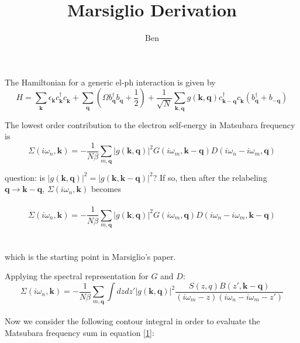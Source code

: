 \documentclass[]{article}
\title{Marsiglio Derivation}
\author{Ben}
\newcommand{\kk}{\mathbf{k}}
\newcommand{\qq}{\mathbf{q}}
\newcommand{\iwn}{i\omega_n}
\newcommand{\iwm}{i\omega_m}
\newcommand{\cd}[1]{c_{#1}^\dagger}
\newcommand{\cc}[1]{c_{#1}^{\phantom{\dagger}}}
\newcommand{\gs}{\left| g(\mathbf{k}, \mathbf{q}) \right|^2}
\begin{document}
\maketitle

\begin{abstract}

\end{abstract}

The Hamiltonian for a generic el-ph interaction is given by
\begin{equation}
H = \sum_\kk \epsilon_\kk \cd{\kk} \cc{\kk}
 + \sum_\qq \left( \Omega b^\dagger_\qq b^{\phantom{\dagger}}_\qq + \frac{1}{2}\right) + \frac{1}{\sqrt{N}} \sum_{\kk,\qq} g(\kk, \qq) \cd{\kk-\qq} \cc{\kk} \left( b^\dagger_\qq + b^{\phantom{\dagger}}_{-\qq} \right) 
\end{equation}

The lowest order contribution to the electron self-energy in Matsubara frequency is
\begin{equation}
\Sigma(\iwn, \kk) = -\frac{1}{N \beta} \sum_{m,\qq} \gs G(\iwm, \kk-\qq) D(\iwn-\iwm,\qq)
\end{equation}

question: is $\left|g(\kk,\qq)\right|^2=\left|g(\kk,\kk-\qq)\right|^2$? If so, then after the relabeling $\qq \rightarrow \kk-\qq$, $\Sigma(\iwn,\kk)$ becomes
\\
\\
\begin{equation}
\Sigma(\iwn, \kk) = -\frac{1}{N \beta} \sum_{m,\qq} \gs G(\iwm, \qq) D(\iwn-\iwm,\kk-\qq)
\end{equation}
\\
\\
which is the starting point in Marsiglio's paper.

Applying the spectral representation for $G$ and $D$:
\begin{equation}
\label{1}
\Sigma(\iwn, \kk) = -\frac{1}{N \beta} \sum_{m,\qq} \int dz dz' \gs \frac{S(z,q) B(z',\kk-\qq)}{(\iwm-z)(\iwn-\iwm-z')} 
\end{equation}
\\
Now we consider the following contour integral in order to evaluate the Matsubara frequency sum in equation \ref{1}:
\end{document}
